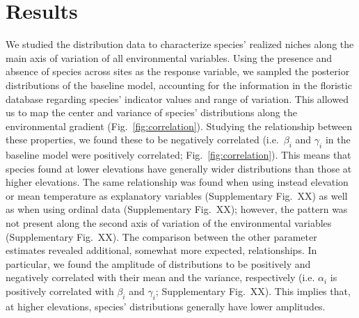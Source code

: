 \documentclass[11pt, a4paper]{article}
\begin{document}
\section*{Results}
We studied the distribution data to characterize species' realized niches along the main axis of variation of all environmental variables. Using the presence and absence of species across sites as the response variable, we sampled the posterior distributions of the baseline model, accounting for the information in the floristic database regarding species' indicator values and range of variation. This allowed us to map the center and variance of species' distributions along the environmental gradient (Fig.~\ref{fig:correlation}).  Studying the relationship between these properties, we found these to be negatively correlated (i.e.~$\beta_{i}$ and $\gamma_{i}$ in the baseline model were positively correlated; Fig.~\ref{fig:correlation}). This means that species found at lower elevations have generally wider distributions than those at higher elevations. The same relationship was found when using instead elevation or mean temperature as explanatory variables (Supplementary Fig.~XX) as well as when using ordinal data (Supplementary Fig.~XX); however, the pattern was not present along the second axis of variation of the environmental variables (Supplementary Fig.~XX). The comparison between the other parameter estimates revealed additional, somewhat more expected, relationships. In particular, we found the amplitude of distributions to be positively and negatively correlated with their mean and the variance, respectively (i.e. $\alpha_{i}$ is positively correlated with $\beta_{i}$ and $\gamma_{i}$; Supplementary Fig.~XX). This implies that, at higher elevations, species' distributions generally have lower amplitudes.
\end{document}
